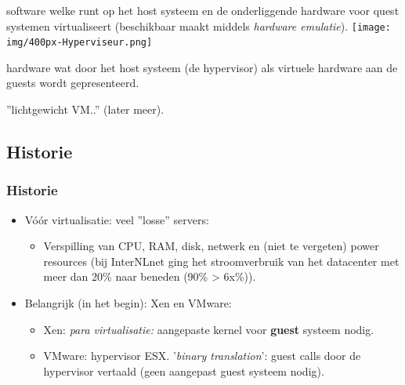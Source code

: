 \begin{styleframe}
    \frametitle{}
\begin{description}[blaat]
	\item[hypervisor] software welke runt op het host systeem en de onderliggende hardware voor quest systemen virtualiseert (beschikbaar maakt middels {\it hardware emulatie}).
	\texttt{[image: img/400px-Hyperviseur.png]}\\
	\pause
	\item[hardware emulatie] hardware wat door het host systeem (de hypervisor) als virtuele hardware aan de guests wordt gepresenteerd.
	\pause
	\item[container] ''lichtgewicht VM..'' (later meer).
\end{description}
\end{styleframe}

\subsection{Historie}
\begin{styleframe}
    \frametitle{Historie}
\begin{itemize}
	\item V\'o\'or virtualisatie: veel ''losse'' servers:
	\pause
	\begin{itemize}
		\item Verspilling van CPU, RAM, disk, netwerk en (niet te vergeten) power resources (bij InterNLnet ging het stroomverbruik van het datacenter met meer dan 20\% naar beneden (90\% \-> 6x\%)).
		\pause
	\end{itemize}
	\item Belangrijk (in het begin): Xen en VMware:
	\pause
	\begin{itemize}
		\item Xen: {\it para virtualisatie:} aangepaste kernel voor {\bf guest} systeem nodig.
		\pause
		\item VMware: hypervisor ESX. '{\it binary translation}': guest calls door de hypervisor vertaald (geen aangepast guest systeem nodig).
	\end{itemize}
\end{itemize}
\end{styleframe}

